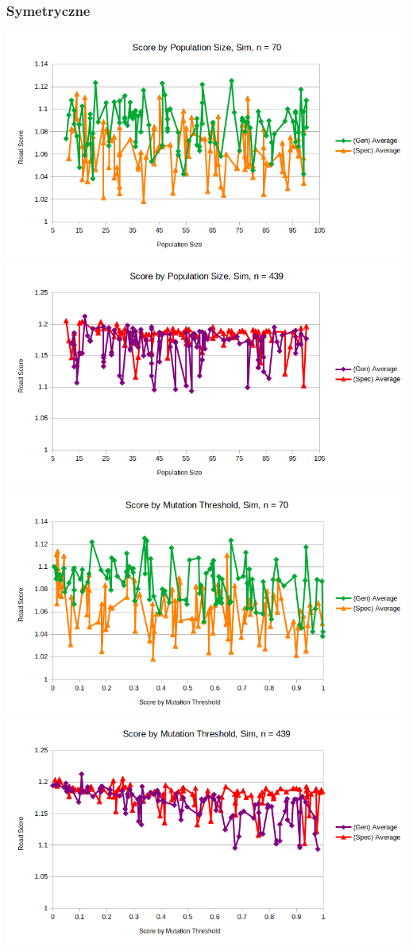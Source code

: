 \documentclass{article}
\begin{document}
\subsubsection*{Symetryczne}
\includegraphics[scale=0.36]{pSSim70}
\includegraphics[scale=0.36]{pSSim439}
\includegraphics[scale=0.36]{mTSim70}
\includegraphics[scale=0.36]{mTSim439}
\end{document}
